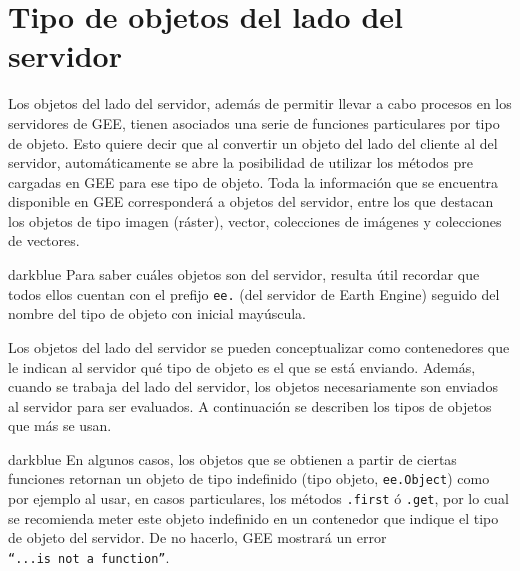 \documentclass[
  12pt,
  letterpaper,
  twoside]{book}
\begin{document}
\hypertarget{tipo-de-objetos-del-lado-del-servidor}{%
\section{Tipo de objetos del lado del servidor}\label{tipo-de-objetos-del-lado-del-servidor}}

Los objetos del lado del servidor, además de permitir llevar a cabo procesos en los servidores de GEE, tienen asociados una serie de funciones particulares por tipo de objeto. Esto quiere decir que al convertir un objeto del lado del cliente al del servidor, automáticamente se abre la posibilidad de utilizar los métodos pre cargadas en GEE para ese tipo de objeto. Toda la información que se encuentra disponible en GEE corresponderá a objetos del servidor, entre los que destacan los objetos de tipo imagen (ráster), vector, colecciones de imágenes y colecciones de vectores.

\begin{bluebox2}

\begin{awesomeblock}{5pt}{\faLightbulb}{darkblue}
Para saber cuáles objetos son del servidor, resulta útil recordar que todos ellos cuentan con el prefijo \texttt{ee.} (del servidor de Earth Engine) seguido del nombre del tipo de objeto con inicial mayúscula.

\end{awesomeblock}

\end{bluebox2}

Los objetos del lado del servidor se pueden conceptualizar como contenedores que le indican al servidor qué tipo de objeto es el que se está enviando. Además, cuando se trabaja del lado del servidor, los objetos necesariamente son enviados al servidor para ser evaluados. A continuación se describen los tipos de objetos que más se usan.

\begin{bluebox2}

\begin{awesomeblock}{5pt}{\faLightbulb}{darkblue}
En algunos casos, los objetos que se obtienen a partir de ciertas funciones retornan un objeto de tipo indefinido (tipo objeto, \texttt{ee.Object}) como por ejemplo al usar, en casos particulares, los métodos \texttt{.first} ó \texttt{.get}, por lo cual se recomienda meter este objeto indefinido en un contenedor que indique el tipo de objeto del servidor. De no hacerlo, GEE mostrará un error \texttt{“...is\ not\ a\ function”}.

\end{awesomeblock}

\end{bluebox2}
\end{document}
